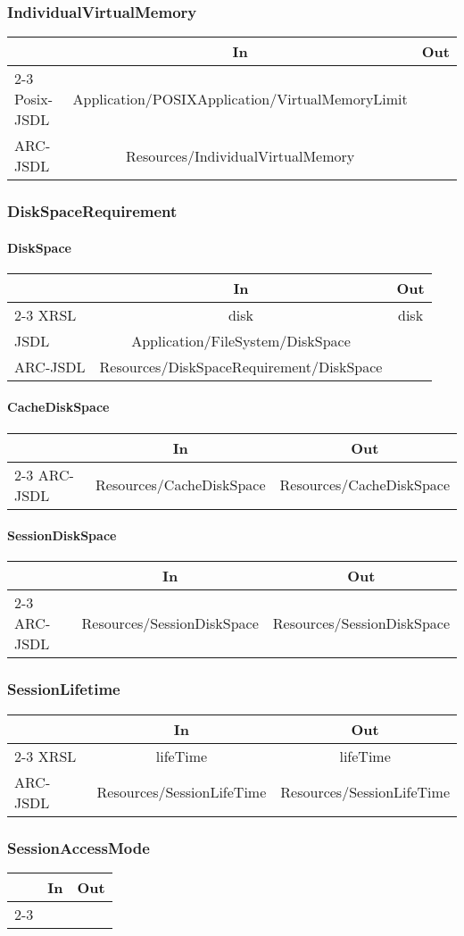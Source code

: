 \documentclass{article}
\newcommand{\subsubsubsection}[1]{\paragraph{#1}}
\newenvironment{inouttabular}%
{\begin{center}\begin{tabular}{l>{\ttfamily\footnotesize}c>{\ttfamily\footnotesize}c}%
\toprule
& \textnormal{\normalsize{In}} & \textnormal{\normalsize{Out}}\\ \cmidrule{2-3}}
{\bottomrule\end{tabular}\end{center}}
\begin{document}
\subsubsection{IndividualVirtualMemory}
\begin{inouttabular}
Posix-JSDL & Application/POSIXApplication/VirtualMemoryLimit &\\
ARC-JSDL & Resources/IndividualVirtualMemory &\\
\end{inouttabular}

\subsubsection{DiskSpaceRequirement}
\subsubsubsection{DiskSpace}
\begin{inouttabular}
XRSL & disk & disk\\
JSDL & Application/FileSystem/DiskSpace &\\
ARC-JSDL & Resources/DiskSpaceRequirement/DiskSpace &\\
\end{inouttabular}

\subsubsubsection{CacheDiskSpace}
\begin{inouttabular}
ARC-JSDL & Resources/CacheDiskSpace & Resources/CacheDiskSpace\\
\end{inouttabular}

\subsubsubsection{SessionDiskSpace}
\begin{inouttabular}
ARC-JSDL & Resources/SessionDiskSpace & Resources/SessionDiskSpace\\
\end{inouttabular}

\subsubsection{SessionLifetime}
\begin{inouttabular}
XRSL & lifeTime & lifeTime\\
ARC-JSDL & Resources/SessionLifeTime & Resources/SessionLifeTime\\
\end{inouttabular}

\subsubsection{SessionAccessMode}
\begin{inouttabular}
\end{inouttabular}
\end{document}
